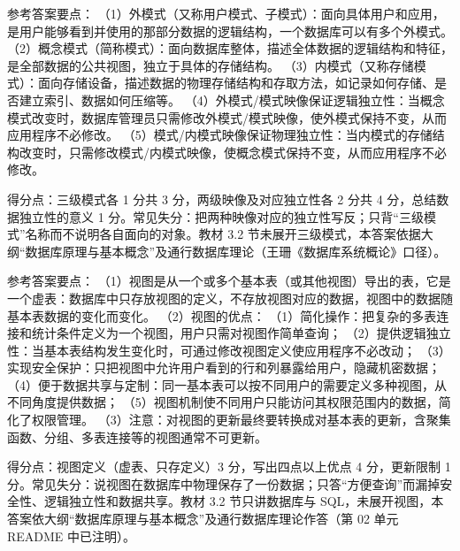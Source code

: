 \documentclass[a4paper,11pt]{article}
\begin{document}
\q 参考答案要点：
（1）外模式（又称用户模式、子模式）：面向具体用户和应用，是用户能够看到并使用的那部分数据的逻辑结构，一个数据库可以有多个外模式。
（2）概念模式（简称模式）：面向数据库整体，描述全体数据的逻辑结构和特征，是全部数据的公共视图，独立于具体的存储结构。
（3）内模式（又称存储模式）：面向存储设备，描述数据的物理存储结构和存取方法，如记录如何存储、是否建立索引、数据如何压缩等。
（4）外模式/模式映像保证逻辑独立性：当概念模式改变时，数据库管理员只需修改外模式/模式映像，使外模式保持不变，从而应用程序不必修改。
（5）模式/内模式映像保证物理独立性：当内模式的存储结构改变时，只需修改模式/内模式映像，使概念模式保持不变，从而应用程序不必修改。
\begin{analysis}得分点：三级模式各 1 分共 3 分，两级映像及对应独立性各 2 分共 4 分，总结数据独立性的意义 1 分。常见失分：把两种映像对应的独立性写反；只背“三级模式”名称而不说明各自面向的对象。教材 3.2 节未展开三级模式，本答案依据大纲“数据库原理与基本概念”及通行数据库理论（王珊《数据库系统概论》口径）。\end{analysis}

\q 参考答案要点：
（1）视图是从一个或多个基本表（或其他视图）导出的表，它是一个虚表：数据库中只存放视图的定义，不存放视图对应的数据，视图中的数据随基本表数据的变化而变化。
（2）视图的优点：
（1）简化操作：把复杂的多表连接和统计条件定义为一个视图，用户只需对视图作简单查询；
（2）提供逻辑独立性：当基本表结构发生变化时，可通过修改视图定义使应用程序不必改动；
（3）实现安全保护：只把视图中允许用户看到的行和列暴露给用户，隐藏机密数据；
（4）便于数据共享与定制：同一基本表可以按不同用户的需要定义多种视图，从不同角度提供数据；
（5）视图机制使不同用户只能访问其权限范围内的数据，简化了权限管理。
（3）注意：对视图的更新最终要转换成对基本表的更新，含聚集函数、分组、多表连接等的视图通常不可更新。
\begin{analysis}得分点：视图定义（虚表、只存定义）3 分，写出四点以上优点 4 分，更新限制 1 分。常见失分：说视图在数据库中物理保存了一份数据；只答“方便查询”而漏掉安全性、逻辑独立性和数据共享。教材 3.2 节只讲数据库与 SQL，未展开视图，本答案依大纲“数据库原理与基本概念”及通行数据库理论作答（第 02 单元 README 中已注明）。\end{analysis}

\end{document}
